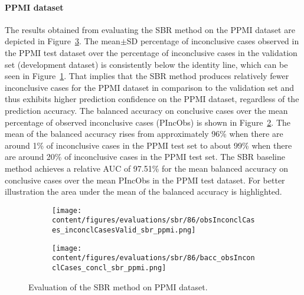 


\paragraph{PPMI dataset}

The results obtained from evaluating the SBR method on the PPMI dataset 
are depicted in Figure~\ref{fig:perf_results_sbr_ppmi}.
The mean$\pm$SD percentage of inconclusive cases observed in the PPMI test dataset 
over the percentage of inconclusive cases in the validation set (development dataset) 
is consistently below the identity line, 
which can be seen in Figure~\ref{fig:obsInconclCases_inconclCasesValid_sbr_ppmi}.
That implies that the SBR method produces relatively fewer inconclusive cases for the PPMI dataset  
in comparison to the validation set and thus exhibits higher prediction confidence on the PPMI dataset, 
regardless of the prediction accuracy.
The balanced accuracy on conclusive cases over the mean percentage of observed inconclusive cases (PIncObs) is shown 
in Figure~\ref{fig:bacc_obsInconclCases_concl_sbr_ppmi}.
The mean of the balanced accuracy rises from approximately 96\% 
when there are around 1\% of inconclusive cases in the PPMI test set to about 99\% 
when there are around 20\% of inconclusive cases in the PPMI test set.
The SBR baseline method achieves a relative AUC of 97.51\% for the mean balanced accuracy on conclusive cases 
over the mean PIncObs in the PPMI test dataset.
For better illustration the area under the mean of the balanced accuracy is highlighted.


\begin{figure}[ht]
  \begin{subfigure}{0.9\textwidth}
    \centering
    \texttt{[image: content/figures/evaluations/sbr/86/obsInconclCases\_inconclCasesValid\_sbr\_ppmi.png]}
    \label{fig:obsInconclCases_inconclCasesValid_sbr_ppmi}
  \end{subfigure}
  \hfill
  \begin{subfigure}{0.9\textwidth}
    \centering
    \texttt{[image: content/figures/evaluations/sbr/86/bacc\_obsInconclCases\_concl\_sbr\_ppmi.png]}
    \label{fig:bacc_obsInconclCases_concl_sbr_ppmi}
  \end{subfigure}
  \caption{Evaluation of the SBR method on PPMI dataset.}
  \label{fig:perf_results_sbr_ppmi}
\end{figure}



